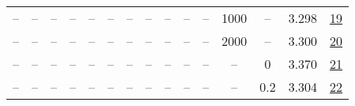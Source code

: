 \begin{table}[H]
\begin{tabular}{ccccccccccccccc}
-- & -- & -- & -- & -- & -- & -- & -- & -- & -- & -- & 1000 & -- & 3.298 & \href{https://wandb.ai/stanford-mercury/optimizer-scaling/runs/sweep-130m-10B-soap2b947dlr0.008-wd0.1-minlr0-warmup1000-b10.95--826793}{19} \\
-- & -- & -- & -- & -- & -- & -- & -- & -- & -- & -- & 2000 & -- & 3.300 & \href{https://wandb.ai/stanford-mercury/optimizer-scaling/runs/sweep-130m-10B-soap8ca28dlr0.008-wd0.1-minlr0-warmup2000-b10.95--f2881e}{20} \\
-- & -- & -- & -- & -- & -- & -- & -- & -- & -- & -- & -- & 0 & 3.370 & \href{https://wandb.ai/stanford-mercury/optimizer-scaling/runs/sweep-130m-10B-soap766156lr0.008-wd0-minlr0-warmup500-b10.95-b20-a5fcff}{21} \\
-- & -- & -- & -- & -- & -- & -- & -- & -- & -- & -- & -- & 0.2 & 3.304 & \href{https://wandb.ai/stanford-mercury/optimizer-scaling/runs/sweep-130m-10B-soapb0d1d0lr0.008-wd0.2-minlr0-warmup500-b10.95-b-5f4fcf}{22} \\
\bottomrule
\end{tabular}
\end{table}

